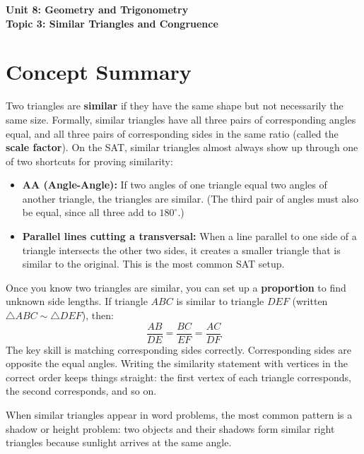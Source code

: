 \documentclass[14pt]{extarticle}
\begin{document}
\raggedright
{}

\begin{center}
    \LARGE \textbf{Unit 8: Geometry and Trigonometry} \\[6pt]
    \Large \textbf{Topic 3: Similar Triangles and Congruence}
\end{center}

\vspace{1em}

\section*{Concept Summary}

Two triangles are \textbf{similar} if they have the same shape but not necessarily the same size. Formally, similar triangles have all three pairs of corresponding angles equal, and all three pairs of corresponding sides in the same ratio (called the \textbf{scale factor}). On the SAT, similar triangles almost always show up through one of two shortcuts for proving similarity:

\begin{itemize}
  \item \textbf{AA (Angle-Angle):} If two angles of one triangle equal two angles of another triangle, the triangles are similar. (The third pair of angles must also be equal, since all three add to \(180^\circ\).)
  \item \textbf{Parallel lines cutting a transversal:} When a line parallel to one side of a triangle intersects the other two sides, it creates a smaller triangle that is similar to the original. This is the most common SAT setup.
\end{itemize}

Once you know two triangles are similar, you can set up a \textbf{proportion} to find unknown side lengths. If triangle \(ABC\) is similar to triangle \(DEF\) (written \(\triangle ABC \sim \triangle DEF\)), then:
\[
\frac{AB}{DE} = \frac{BC}{EF} = \frac{AC}{DF}
\]
The key skill is matching corresponding sides correctly. Corresponding sides are opposite the equal angles. Writing the similarity statement with vertices in the correct order keeps things straight: the first vertex of each triangle corresponds, the second corresponds, and so on.

When similar triangles appear in word problems, the most common pattern is a shadow or height problem: two objects and their shadows form similar right triangles because sunlight arrives at the same angle.
\end{document}
